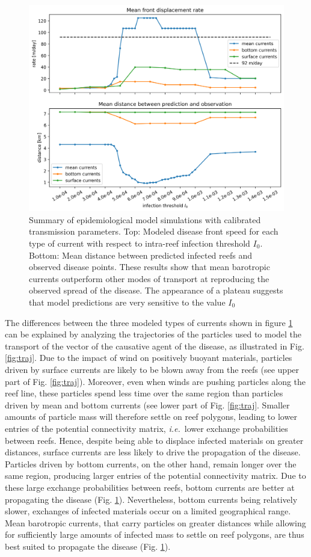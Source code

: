 \documentclass[utf8]{frontiersSCNS}
\newcommand{\ie}{{\it i.e.}\ }
\begin{document}
\begin{figure}
    \centering
    \includegraphics[width=.8\textwidth]{figures/sctld_validation_corrected.png}
    \caption{Summary of epidemiological model simulations with calibrated transmission parameters. Top: Modeled disease front speed for each type of current with respect to intra-reef infection threshold $I_0$. Bottom: Mean distance between predicted infected reefs and observed disease points. These results show that mean barotropic currents outperform other modes of transport at reproducing the observed spread of the disease. The appearance of a plateau suggests that model predictions are very sensitive to the value $I_0$}
    \label{fig:results}
\end{figure}

The differences between the three modeled types of currents shown in figure \ref{fig:results} can be explained by analyzing the trajectories of the particles used to model the transport of the vector of the causative agent of the disease, as illustrated in Fig. \ref{fig:traj}. Due to the impact of wind on positively buoyant materials, particles driven by surface currents are likely to be blown away from the reefs (see upper part of Fig. \ref{fig:traj}). Moreover, even when winds are pushing particles along the reef line, these particles spend less time over the same region than particles driven by mean and bottom currents (see lower part of Fig. \ref{fig:traj}. Smaller amounts of particle mass will therefore settle on reef polygons, leading to lower entries of the potential connectivity matrix, \ie lower exchange probabilities between reefs. Hence, despite being able to displace infected materials on greater distances, surface currents are less likely to drive the propagation of the disease. Particles driven by bottom currents, on the other hand, remain longer over the same region, producing larger entries of the potential connectivity matrix. Due to these large exchange probabilities between reefs, bottom currents are better at propagating the disease (Fig. \ref{fig:results}). Nevertheless, bottom currents being relatively slower, exchanges of infected materials occur on a limited geographical range. Mean barotropic currents, that carry particles on greater distances while allowing for sufficiently large amounts of infected mass to settle on reef polygons, are thus best suited to propagate the disease (Fig. \ref{fig:results}).
\end{document}
